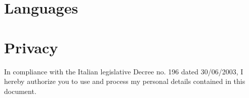 \documentclass[11pt,a4paper,sans]{moderncv} %
\begin{document}
\section{Languages}


\section{Privacy}
In compliance with the Italian legislative Decree no. 196 dated 30/06/2003, I hereby authorize you to use and process my personal details contained in this document.

\end{document}
